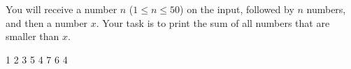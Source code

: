 




You will receive a number $n$ ($1\leq n \leq 50$) on the input, followed by $n$ numbers, and then a number $x$. Your task is to print the sum of all numbers that are smaller than $x$.

1 2 3 5 4 7 6
4
\koniec


